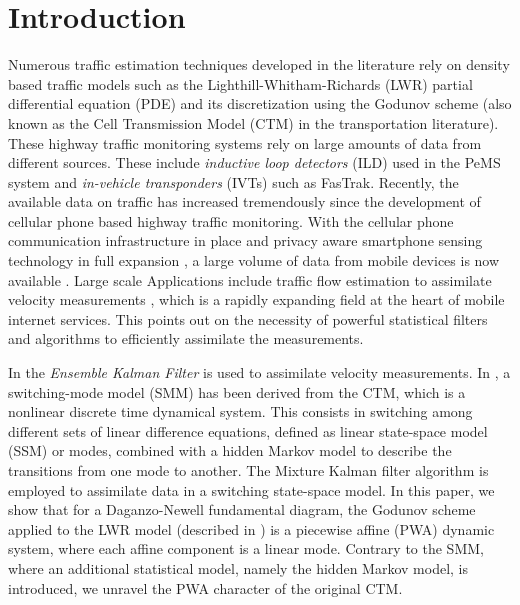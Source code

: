 \section{Introduction}

Numerous traffic estimation techniques developed in the literature rely on density based traffic models such as the Lighthill-Whitham-Richards (LWR) partial differential equation (PDE) \cite{Lighthill1955,Richards1956} and its discretization using the Godunov scheme \cite{Lebacque1996,LeVeque1992,Strub2006} (also known as the Cell Transmission Model (CTM) \cite{Daganzo1994,Daganzo1995} in the transportation literature). These highway traffic monitoring systems rely on large amounts of data from different sources. These include \textit{inductive loop detectors} (ILD) used in the PeMS system \cite{Chen2005} and \textit{in-vehicle transponders} (IVTs) such as FasTrak. Recently, the available data on traffic has increased tremendously since the development of cellular phone based highway traffic monitoring. With the cellular phone communication infrastructure in place and privacy aware smartphone sensing technology in full expansion \cite{Hoh2008}, a large volume of data from mobile devices is now available \cite{Herrera2009}. Large scale Applications include traffic flow estimation to assimilate velocity measurements \cite{Work2008,Work2008a}, which is a rapidly expanding field at the heart of mobile internet services. This points out on the necessity of powerful statistical filters and algorithms to efficiently assimilate the measurements.

In \cite{Work2008,Work2008a} the \textit{Ensemble Kalman Filter} is used to assimilate velocity measurements. In \cite{Munoz2003}, a switching-mode model (SMM) has been derived from the CTM, which is a nonlinear discrete time dynamical system. This consists in switching among different sets of linear difference equations, defined as linear state-space model (SSM) or modes, combined with a hidden Markov model to describe the transitions from one mode to another. The Mixture Kalman filter algorithm \cite{Chen2000} is employed to assimilate data in a switching state-space model. In this paper, we show that for a Daganzo-Newell fundamental diagram, the Godunov scheme applied to the LWR model (described in \cite{Daganzo1995}) is a piecewise affine (PWA) dynamic system, where each affine component is a linear mode. Contrary to the SMM, where an additional statistical model, namely the hidden Markov model, is introduced, we unravel the PWA character of the original CTM.